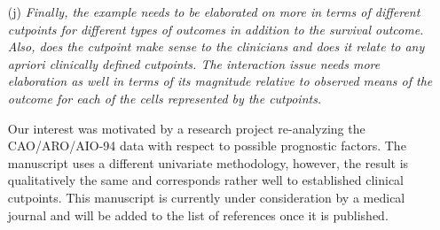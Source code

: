 \documentclass[11pt,a4paper]{article}
\begin{document}
\begin{enumerate}
\begin{itemize}
    \item[(j)] \textit{Finally, the example needs to be elaborated on more in terms
               of different cutpoints for different types of outcomes in addition to
	       the survival outcome. Also, does the cutpoint make sense to the
	       clinicians and does it relate to any apriori clinically defined
	       cutpoints. The interaction issue needs more elaboration as well in
	       terms of its magnitude relative to observed means of the outcome for
	       each of the cells represented by the cutpoints.}
	       
Our interest was motivated by a research project re-analyzing the CAO/ARO/AIO-94
data with respect to possible prognostic factors. The manuscript uses 
a different univariate methodology, however, the result is qualitatively the same
and corresponds rather well to established clinical cutpoints. 
This manuscript is currently under consideration by a medical journal and will
be added to the list of references once it is published.

\end{itemize}
  
\end{enumerate}
\end{document}
